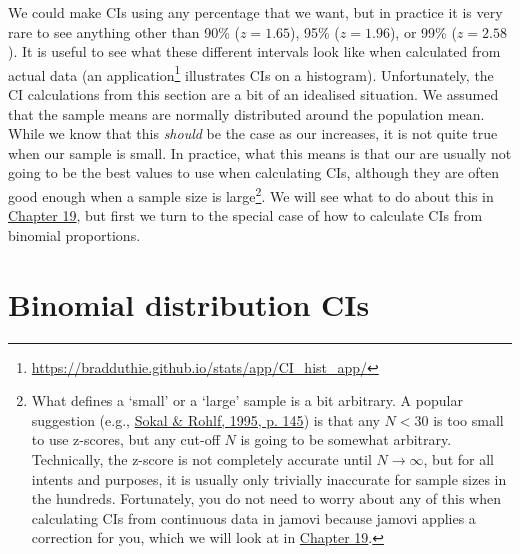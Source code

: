 \documentclass[
  openany]{krantz}
\begin{document}
We could make CIs using any percentage that we want, but in practice it is very rare to see anything other than 90\% (\(z = 1.65\)), 95\% (\(z = 1.96\)), or 99\% (\(z = 2.58\)).
It is useful to see what these different intervals look like when calculated from actual data (an  application\footnote{\url{https://bradduthie.github.io/stats/app/CI_hist_app/}} illustrates CIs on a histogram).
Unfortunately, the CI calculations from this section are a bit of an idealised situation.
We assumed that the sample means are normally distributed around the population mean.
While we know that this \emph{should} be the case as our  increases, it is not quite true when our sample is small.
In practice, what this means is that our  are usually not going to be the best values to use when calculating CIs, although they are often good enough when a sample size is large\footnote{What defines a `small' or a `large' sample is a bit arbitrary. A popular suggestion (e.g., \protect\hyperlink{ref-Sokal1995}{Sokal \& Rohlf, 1995, p. 145}) is that any \(N < 30\) is too small to use z-scores, but any cut-off \(N\) is going to be somewhat arbitrary. Technically, the z-score is not completely accurate until \(N \to \infty\), but for all intents and purposes, it is usually only trivially inaccurate for sample sizes in the hundreds. Fortunately, you do not need to worry about any of this when calculating CIs from continuous data in jamovi because jamovi applies a correction for you, which we will look at in \protect\hyperlink{Chapter_19}{Chapter 19}.}.
We will see what to do about this in \protect\hyperlink{Chapter_19}{Chapter 19}, but first we turn to the special case of how to calculate CIs from binomial proportions.

\hypertarget{binomial-distribution-cis}{%
\section{Binomial distribution CIs}\label{binomial-distribution-cis}}
\end{document}
